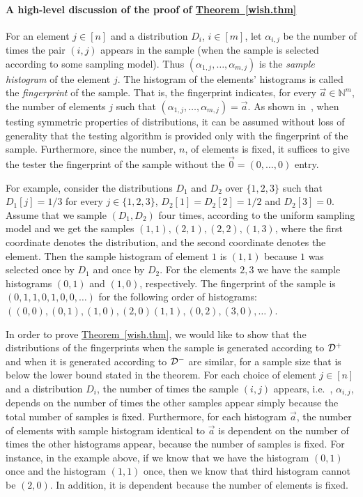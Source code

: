 \documentclass[10pt]{article}
\theoremstyle{definition}
\providecommand{\ie}{i.e.\ }
\numberwithin{equation}{section}
\newcommand{\expref}[2]{\texorpdfstring{\hyperref[#2]{#1~\ref{#2}}}{#1~\ref{#2}}}
\newcommand{\calD}{{\cal D}}
\begin{document}
\paragraph{A high-level discussion of the proof of \expref{Theorem}{wish.thm}}
For an element $j \in [n]$ and a distribution $D_i$,
$i \in[m]$, let $\alpha_{i,j}$ be the number of times the pair $(i,j)$ appears in the sample
(when the sample is selected according to some sampling model).
Thus $(\alpha_{1, j}, \ldots, \alpha_{m, j})$ is the \emph{sample histogram} of the element $j$.
The histogram of the elements' histograms is called the
\emph{fingerprint} of the sample. That is, the fingerprint indicates,
for every $\vec{a} \in \mathbb{N}^m$, the number of elements $j$ such
that $(\alpha_{1, j}, \ldots, \alpha_{m, j}) = \vec{a}$.
\sloppy
As shown in~\cite{BFRSW-long},
%
 when testing symmetric properties of distributions, it can be assumed without loss of
generality that the testing algorithm is provided only with the
fingerprint of the sample.
%
%
Furthermore, since the number, $n$, of elements is fixed,
it suffices to give the tester the fingerprint
of the sample without the $\vec{0} = (0,\ldots,0)$ entry.

For example, consider the distributions $D_1$ and $D_2$ over $\{1,2,3\}$ such that $D_1[j] = 1/3$ for every $j\in \{1,2,3\}$, $D_2[1]=D_2[2] = 1/2$ and $D_2[3] = 0$. Assume that we sample $(D_1, D_2)$ four times, according to the uniform sampling model and we get the samples $(1,1), (2,1), (2,2), (1,3)$, where the first coordinate
denotes the distribution, and the second coordinate denotes the element.
Then the sample histogram of element $1$ is $(1,1)$ because $1$ was selected once by $D_1$ and once by $D_2$. For the elements $2,3$ we have the sample histograms $(0,1)$  and $(1,0)$, respectively. The fingerprint of the sample is $(0,1,1,0,1,0,0,\ldots)$ for the following order of histograms: $((0,0), (0,1), (1,0), (2,0) (1,1), (0,2), (3,0), \ldots)$.

%
\smallskip
In order to prove \expref{Theorem}{wish.thm}, we would like to show that
the distributions of the fingerprints when the sample is generated according
to $\calD^+$ and when it is generated according to $\calD^-$ are similar,
for a sample size that is below the lower bound stated in the theorem.
%
%
For each choice of
element $j\in [n]$ and a distribution $D_i$, %
the number of times  the sample $(i,j)$ appears, \ie, $\alpha_{i,j}$,
depends on the number of times the other samples appear simply because
the total number of samples is fixed.
Furthermore,
%
for each histogram $\vec{a}$,
the number of elements with sample histogram identical to $\vec{a}$
is dependent on the number of times the other histograms appear,
because the number of samples is fixed.
For instance, in the example above, if we know that we have the
histogram $(0,1)$ once and the histogram $(1,1)$ once,
 then we know that third histogram cannot be $(2,0)$. In addition,
it is dependent because the number of elements is fixed.
\end{document}
